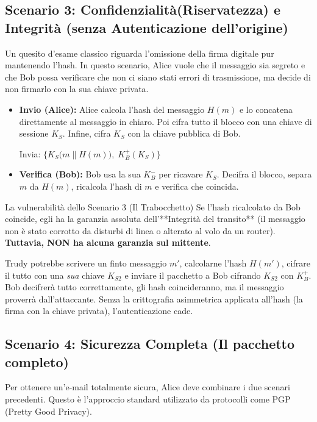 \documentclass[a4paper,12pt]{report}
\newcommand{\KBp}{K_B^+} %
\newcommand{\KBm}{K_B^-}
\begin{document}
\subsection{Scenario 3: Confidenzialità(Riservatezza) e Integrità (senza Autenticazione dell'origine)}
Un quesito d'esame classico riguarda l'omissione della firma digitale pur mantenendo l'hash. In questo scenario, Alice vuole che il messaggio sia segreto e che Bob possa verificare che non ci siano stati errori di trasmissione, ma decide di non firmarlo con la sua chiave privata.

\begin{itemize}
    \item \textbf{Invio (Alice):} Alice calcola l'hash del messaggio $H(m)$ e lo concatena direttamente al messaggio in chiaro. Poi cifra tutto il blocco con una chiave di sessione $K_S$. Infine, cifra $K_S$ con la chiave pubblica di Bob.
    
    \begin{center}
        Invia: $\bigl\{K_S\bigl(m \parallel H(m)\bigr),\;\KBp(K_S)\bigr\}$
    \end{center}
    
    \item \textbf{Verifica (Bob):} Bob usa la sua $\KBm$ per ricavare $K_S$. Decifra il blocco, separa $m$ da $H(m)$, ricalcola l'hash di $m$ e verifica che coincida.
\end{itemize}

\begin{urgentbox}{La vulnerabilità dello Scenario 3 (Il Trabocchetto)}
Se l'hash ricalcolato da Bob coincide, egli ha la garanzia assoluta dell'**Integrità del transito** (il messaggio non è stato corrotto da disturbi di linea o alterato al volo da un router). \textbf{Tuttavia, NON ha alcuna garanzia sul mittente}.

Trudy potrebbe scrivere un finto messaggio $m'$, calcolarne l'hash $H(m')$, cifrare il tutto con una \textit{sua} chiave $K_{S2}$ e inviare il pacchetto a Bob cifrando $K_{S2}$ con $\KBp$. Bob decifrerà tutto correttamente, gli hash coincideranno, ma il messaggio proverrà dall'attaccante. Senza la crittografia asimmetrica applicata all'hash (la firma con la chiave privata), l'autenticazione cade.
\end{urgentbox}

\newpage
\subsection{Scenario 4: Sicurezza Completa (Il pacchetto completo)}
Per ottenere un'e-mail totalmente sicura, Alice deve combinare i due scenari precedenti. Questo è l'approccio standard utilizzato da protocolli come PGP (Pretty Good Privacy).
\end{document}
